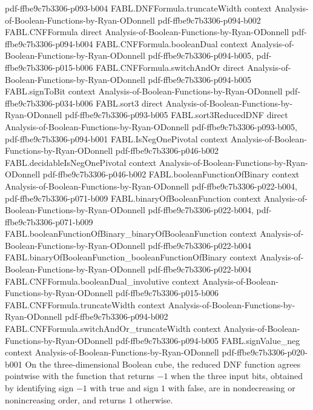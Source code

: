 \begin{theorem}
  {pdf-ffbe9c7b3306-p093-b004}
\proofstep
  {FABL.DNFFormula.truncateWidth}
  {context}
  {Analysis-of-Boolean-Functions-by-Ryan-ODonnell}
  {pdf-ffbe9c7b3306-p094-b002}
\proofstep
  {FABL.CNFFormula}
  {direct}
  {Analysis-of-Boolean-Functions-by-Ryan-ODonnell}
  {pdf-ffbe9c7b3306-p094-b004}
\proofstep
  {FABL.CNFFormula.booleanDual}
  {context}
  {Analysis-of-Boolean-Functions-by-Ryan-ODonnell}
  {pdf-ffbe9c7b3306-p094-b005,
    pdf-ffbe9c7b3306-p015-b006}
\proofstep
  {FABL.CNFFormula.switchAndOr}
  {direct}
  {Analysis-of-Boolean-Functions-by-Ryan-ODonnell}
  {pdf-ffbe9c7b3306-p094-b005}
\proofstep
  {FABL.signToBit}
  {context}
  {Analysis-of-Boolean-Functions-by-Ryan-ODonnell}
  {pdf-ffbe9c7b3306-p034-b006}
\proofstep
  {FABL.sort3}
  {direct}
  {Analysis-of-Boolean-Functions-by-Ryan-ODonnell}
  {pdf-ffbe9c7b3306-p093-b005}
\proofstep
  {FABL.sort3ReducedDNF}
  {direct}
  {Analysis-of-Boolean-Functions-by-Ryan-ODonnell}
  {pdf-ffbe9c7b3306-p093-b005,
    pdf-ffbe9c7b3306-p094-b001}
\proofstep
  {FABL.IsNegOnePivotal}
  {context}
  {Analysis-of-Boolean-Functions-by-Ryan-ODonnell}
  {pdf-ffbe9c7b3306-p046-b002}
\proofstep
  {FABL.decidableIsNegOnePivotal}
  {context}
  {Analysis-of-Boolean-Functions-by-Ryan-ODonnell}
  {pdf-ffbe9c7b3306-p046-b002}
\proofstep
  {FABL.booleanFunctionOfBinary}
  {context}
  {Analysis-of-Boolean-Functions-by-Ryan-ODonnell}
  {pdf-ffbe9c7b3306-p022-b004,
    pdf-ffbe9c7b3306-p071-b009}
\proofstep
  {FABL.binaryOfBooleanFunction}
  {context}
  {Analysis-of-Boolean-Functions-by-Ryan-ODonnell}
  {pdf-ffbe9c7b3306-p022-b004,
    pdf-ffbe9c7b3306-p071-b009}
\proofstep
  {FABL.booleanFunctionOfBinary_binaryOfBooleanFunction}
  {context}
  {Analysis-of-Boolean-Functions-by-Ryan-ODonnell}
  {pdf-ffbe9c7b3306-p022-b004}
\proofstep
  {FABL.binaryOfBooleanFunction_booleanFunctionOfBinary}
  {context}
  {Analysis-of-Boolean-Functions-by-Ryan-ODonnell}
  {pdf-ffbe9c7b3306-p022-b004}
\proofstep
  {FABL.CNFFormula.booleanDual_involutive}
  {context}
  {Analysis-of-Boolean-Functions-by-Ryan-ODonnell}
  {pdf-ffbe9c7b3306-p015-b006}
\proofstep
  {FABL.CNFFormula.truncateWidth}
  {context}
  {Analysis-of-Boolean-Functions-by-Ryan-ODonnell}
  {pdf-ffbe9c7b3306-p094-b002}
\proofstep
  {FABL.CNFFormula.switchAndOr_truncateWidth}
  {context}
  {Analysis-of-Boolean-Functions-by-Ryan-ODonnell}
  {pdf-ffbe9c7b3306-p094-b005}
\proofstep
  {FABL.signValue_neg}
  {context}
  {Analysis-of-Boolean-Functions-by-Ryan-ODonnell}
  {pdf-ffbe9c7b3306-p020-b001}
On the three-dimensional Boolean cube, the reduced DNF function agrees pointwise with
the function that returns $-1$ when the three input bits, obtained by identifying sign
$-1$ with true and sign $1$ with false, are in nondecreasing or nonincreasing order, and
returns $1$ otherwise.
\end{theorem}

